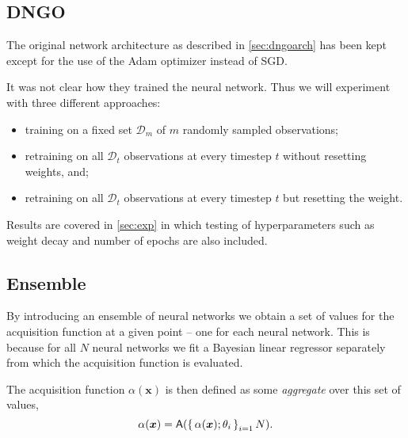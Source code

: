 \documentclass[conference,compsoc]{IEEEtran}
\theoremstyle{definition}
\begin{document}

    \subsection{DNGO}\label{sec:methoddngo}

        The original network architecture as described in \cref{sec:dngoarch} has been kept except for the use of the Adam optimizer \parencite{kingma_adam:_2014} instead of SGD.

        It was not clear how they trained the neural network.
        Thus we will experiment with three different approaches:
        
        \begin{itemize}
            \item training on a fixed set $\mathcal{D}_{m}$ of $m$ randomly sampled observations;
            \item retraining on all $\mathcal{D}_t$ observations at every timestep $t$ without resetting weights, and;
            \item retraining on all $\mathcal{D}_t$ observations at every timestep $t$ but resetting the weight.
        \end{itemize}

        Results are covered in \cref{sec:exp} in which testing of hyperparameters such as weight decay and number of epochs are also included. %

    \subsection{Ensemble}

        By introducing an ensemble of neural networks we obtain a set of values for the acquisition function at a given point -- one for each neural network.
        This is because for all $N$ neural networks we fit a Bayesian linear regressor separately from which the acquisition function is evaluated.

        The acquisition function $\alpha(\bm{x})$ is then defined as some \emph{aggregate} over this set of values,
            \begin{equation}
                \alpha(\bm{x}) = \mathsf{A}(\set{\alpha(\bm{x});\theta_i}_{i=1}{N}).
            \end{equation}
\end{document}
